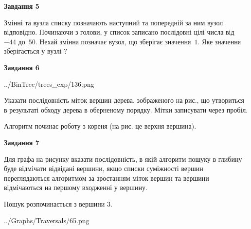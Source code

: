 \documentclass[12pt, ukrainian]{article}
\begin{document}
{\begin {large}
{\begin {center}\textbf{Завдання 5}\end {center}}\par
Змінні  та  вузла списку позначають наступний та попередній за ним вузол відповідно. Починаючи з голови, у список записано послідовні цілі числа від~$-44$ до~$50$. Нехай змінна  позначає вузол, що зберігає значення~$1$.
Яке значення зберігається у вузлі  ?\par
\newpage

{\begin {center}\textbf{Завдання 6}\end {center}}\par

\begin{center}
	{../BinTree/trees_exp/136.png}
\end{center}
Указати послідовність міток вершин дерева, зображеного на рис., що утвориться в результаті обходу дерева в оберненому порядку. Мітки записувати через пробіл.\par Алгоритм починає роботу з кореня (на рис. це верхня вершина).\par
\newpage

{\begin {center}\textbf{Завдання 7}\end {center}}\par
Для графа на рисунку вказати послідовність, в якій алгоритм пошуку в глибину буде відмічати відвідані вершини, якщо списки суміжності вершин переглядаються алгоритмом за зростанням міток вершин та вершини відмічаються на першому вход\-женні у вершину.\par
Пошук розпочинається з вершини 3.\par

\begin{center}
	{../Graphs/Traversals/65.png}
\end{center}\par
\newpage


\end{large}}
\end{document}
